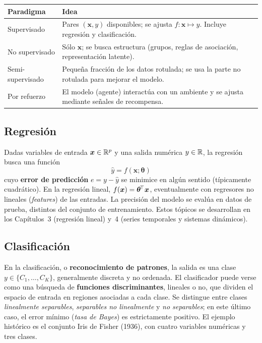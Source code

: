 \begin{center}\small
\begin{tabular}{@{}l p{8.6cm}@{}}
\toprule
\textbf{Paradigma} & \textbf{Idea} \\
\midrule
Supervisado    & Pares $(\bm{x},y)$ disponibles; se ajusta
$f:\bm{x}\mapsto y$. Incluye regresión y clasificación. \\
No supervisado & Sólo $\bm{x}$; se busca estructura (grupos, reglas de
asociación, representación latente). \\
Semi-supervisado & Pequeña fracción de los datos rotulada; se usa la
parte no rotulada para mejorar el modelo. \\
Por refuerzo  & El modelo (agente) interactúa con un ambiente y se ajusta
mediante señales de recompensa. \\
\bottomrule
\end{tabular}
\end{center}

\subsection{Regresión}

Dadas variables de entrada $\bm{x}\in\mathbb{R}^p$ y una salida numérica
$y\in\mathbb{R}$, la regresión busca una función
\[
\hat{y} = f(\bm{x};\bm{\theta})
\]
cuyo \textbf{error de predicción} $e=y-\hat{y}$ se minimice en algún
sentido (típicamente cuadrático). En la regresión lineal,
$f(\bm{x})=\bm{\theta}^{\!\top}\bm{x}$, eventualmente con regresores no lineales
(\emph{features}) de las entradas. La precisión del modelo se evalúa en
datos de prueba, distintos del conjunto de entrenamiento. Estos tópicos
se desarrollan en los Capítulos~3 (regresión lineal) y~4 (series
temporales y sistemas dinámicos).

\subsection{Clasificación}

En la clasificación, o \textbf{reconocimiento de patrones}, la salida es
una clase $y\in\{C_1,\dots,C_K\}$, generalmente discreta y no ordenada.
El clasificador puede verse como una búsqueda de \textbf{funciones
discriminantes}, lineales o no, que dividen el espacio de entrada en
regiones asociadas a cada clase. Se distingue entre clases
\emph{linealmente separables}, \emph{separables no linealmente} y
\emph{no separables}; en este último caso, el error mínimo (\emph{tasa
de Bayes}) es estrictamente positivo. El ejemplo histórico es el conjunto
Iris de Fisher (1936), con cuatro variables numéricas y tres clases.

